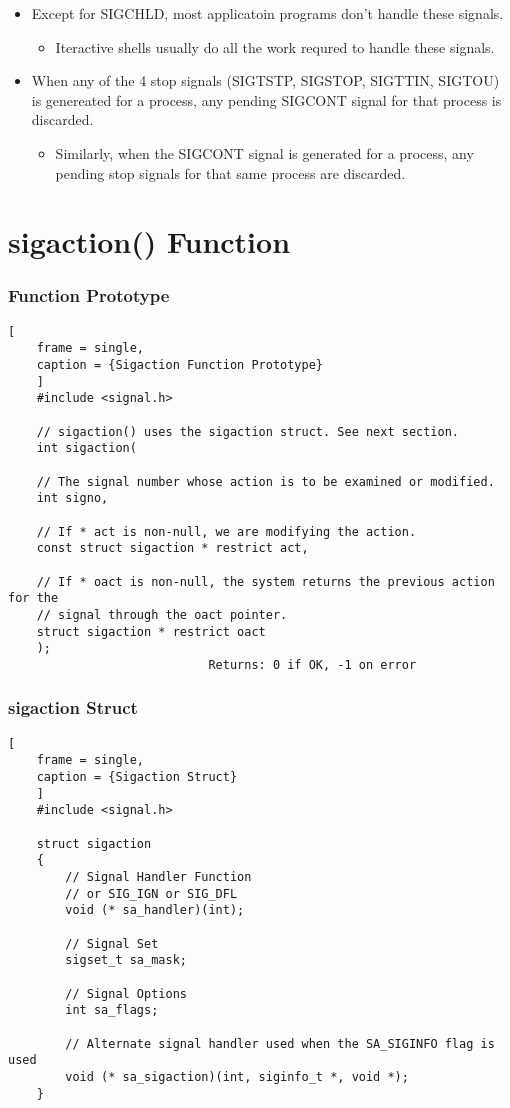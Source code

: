 \documentclass{article}
\begin{document}
\begin{itemize}
    \item Except for SIGCHLD, most applicatoin programs don't handle these signals.
        \begin{itemize}
            \item Iteractive shells usually do all the work requred to handle these signals.
        \end{itemize}

    \item When any of the 4 stop signals (SIGTSTP, SIGSTOP, SIGTTIN, SIGTOU) is genereated for a process, any pending SIGCONT signal for that process is discarded.
        \begin{itemize}
            \item Similarly, when the SIGCONT signal is generated for a process, any pending stop signals for that same process are discarded.
        \end{itemize}
\end{itemize}

\section{\textbf{sigaction()} Function}
\subsubsection{Function Prototype}
\begin{lstlisting}[
    frame = single,
    caption = {Sigaction Function Prototype}
    ]
    #include <signal.h>

    // sigaction() uses the sigaction struct. See next section.
    int sigaction(

    // The signal number whose action is to be examined or modified.
    int signo, 

    // If * act is non-null, we are modifying the action.
    const struct sigaction * restrict act,

    // If * oact is non-null, the system returns the previous action for the
    // signal through the oact pointer.
    struct sigaction * restrict oact
    );
                            Returns: 0 if OK, -1 on error
\end{lstlisting}
\clearpage
\subsubsection{\textbf{sigaction} Struct}
\begin{lstlisting}[
    frame = single,
    caption = {Sigaction Struct}
    ]
    #include <signal.h>

    struct sigaction
    {
        // Signal Handler Function 
        // or SIG_IGN or SIG_DFL
        void (* sa_handler)(int);

        // Signal Set
        sigset_t sa_mask;

        // Signal Options
        int sa_flags;

        // Alternate signal handler used when the SA_SIGINFO flag is used
        void (* sa_sigaction)(int, siginfo_t *, void *);
    }
\end{lstlisting}
\end{document}
